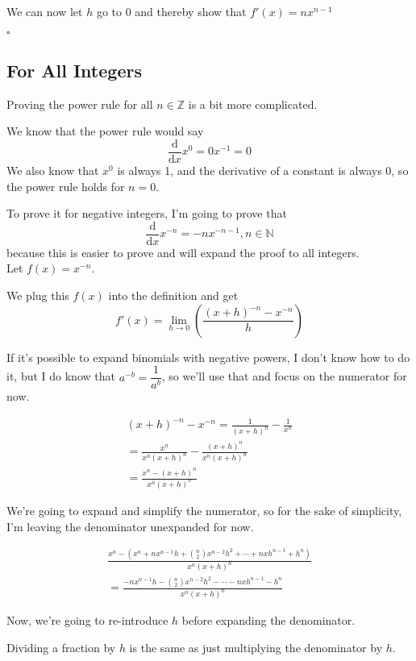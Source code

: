 \documentclass[a4paper]{article}
\newcommand{\deriv}{\dfrac{\text{d}}{\text{d}x}}
\begin{document}
We can now let $h$ go to 0 and thereby show that $f'(x) = nx^{n - 1}$

\hspace*{\fill}$\square$

\subsection{For All Integers}

Proving the power rule for all $n \in \mathbb{Z}$ is a bit more complicated.

We know that the power rule would say $$\deriv x^0 = 0x^{-1} = 0$$ We also know that $x^0$ is always 1, and the derivative of a constant is always 0, so the power rule holds for $n = 0$.

To prove it for negative integers, I'm going to prove that $$\deriv x^{-n} = -nx^{-n-1}, n \in \mathbb{N}$$ because this is easier to prove and will expand the proof to all integers.\\

Let $f(x) = x^{-n}$.

We plug this $f(x)$ into the definition and get $$f'(x) = \lim_{h \to 0}\left( \frac{(x + h)^{-n} - x^{-n}}{h} \right)$$

If it's possible to expand binomials with negative powers, I don't know how to do it, but I do know that $a^{-b} = \dfrac{1}{a^b}$, so we'll use that and focus on the numerator for now.

\begin{gather*}
(x + h)^{-n} - x^{-n} = \frac{1}{(x + h)^n} - \frac{1}{x^n}\\[0.5em]
= \frac{x^n}{x^n(x + h)^n} - \frac{(x + h)^n}{x^n(x + h)^n}\\[0.5em]
= \frac{x^n - (x + h)^n}{x^n(x + h)^n}
\end{gather*}

We're going to expand and simplify the numerator, so for the sake of simplicity, I'm leaving the denominator unexpanded for now.

\begin{gather*}
\frac{x^n - (x^n + nx^{n - 1}h + \binom{n}{2}x^{n - 2}h^2 + \cdots + nxh^{n - 1} + h^n)}{x^n(x + h)^n}\\[0.5em]
= \frac{-nx^{n - 1}h - \binom{n}{2}x^{n - 2}h^2 - \cdots - nxh^{n - 1} - h^n}{x^n(x + h)^n}
\end{gather*}

Now, we're going to re-introduce $h$ before expanding the denominator.

Dividing a fraction by $h$ is the same as just multiplying the denominator by $h$.
\end{document}
